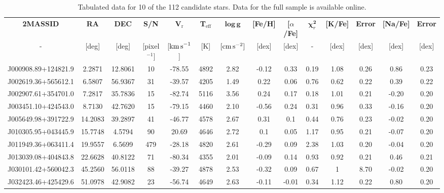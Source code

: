 \documentclass[a4paper,fleqn,usenatbib]{mnras}
\begin{document}
\begin{table}
\centering
\caption{Tabulated data for 10 of the 112 candidate stars. Data for the full sample is available online.}
\label{data:lamost}
\begin{tabular}{cccccccccccccc}
\hline
\textbf{2MASSID} & \textbf{RA} & \textbf{DEC} & \textbf{S/N} & \textbf{V$_\textrm{r}$} & \textbf{T$_\textrm{eff}$} & $\boldsymbol \log{ \, \textbf{g}}$ & \textbf{{[}Fe/H{]}} & \textbf{{[}$\alpha$/Fe{]}} & \textbf{$\boldsymbol \chi_r ^\textbf{2}$} & \textbf{{[}K/Fe{]}} & \textbf{Error} & \textbf{{[}Na/Fe{]}} & \textbf{Error} \\ 
- & {[}deg{]} & {[}deg{]} & [pixel$^{-1}]$ & {[${\rm km\,s}^{-1}$]} & {[}K{]} & $[{\rm cm\,s}^{-2}]$ & {[}dex{]} & {[}dex{]} & - & {[}dex{]} & {[}dex{]} & {[}dex{]} & {[}dex{]} \\ \hline
J000908.89+124821.9 & 2.2871 & 12.8061 & 10 & -78.55 & 4892 & 2.82 & -0.12 & 0.33 & 0.19 & 1.08 & 0.26 & 0.86 & 0.23 \\
J002619.36+565612.1 & 6.5807 & 56.9367 & 31 & -39.57 & 4205 & 1.49 & 0.22 & 0.06 & 0.76 & 0.62 & 0.22 & 0.39 & 0.22 \\
J002907.61+354701.0 & 7.2817 & 35.7836 & 15 & -82.74 & 5116 & 3.56 & 0.24 & 0.17 & 0.18 & 1.01 & 0.21 & -0.20 & 0.20 \\
J003451.10+424543.0 & 8.7130 & 42.7620 & 15 & -79.15 & 4460 & 2.10 & -0.56 & 0.24 & 0.31 & 0.96 & 0.33 & -0.16 & 0.20 \\
J005649.98+391722.9 & 14.2083 & 39.2897 & 41 & -46.77 & 4578 & 2.67 & 0.31 & 0.1 & 0.44 & 0.76 & 0.23 & -0.02 & 0.20 \\
J010305.95+043445.9 & 15.7748 & 4.5794 & 90 & 20.69 & 4646 & 2.72 & 0.1 & 0.05 & 1.17 & 0.95 & 0.21 & -0.07 & 0.20 \\
J011949.36+063411.4 & 19.9557 & 6.5699 & 479 & -28.18 & 4820 & 2.61 & -0.29 & 0.09 & 2.38 & 1.03 & 0.20 & -0.04 & 0.20 \\
J013039.08+404843.8 & 22.6628 & 40.8122 & 71 & -80.34 & 4355 & 2.01 & -0.09 & 0.14 & 0.93 & 0.92 & 0.21 & 0.46 & 0.21 \\
J030101.42+560042.3 & 45.2560 & 56.0118 & 88 & -39.27 & 4878 & 2.53 & -0.32 & 0.09 & 0.67 & 1 & 8.70 & -0.02 & 0.20 \\
J032423.46+425429.6 & 51.0978 & 42.9082 & 23 & -56.74 & 4649 & 2.63 & -0.11 & -0.01 & 0.34 & 1.12 & 0.22 & 0.80 & 0.20 \\ \hline
\end{tabular}
\end{table}



\bsp	%
\label{lastpage}
\end{document}
